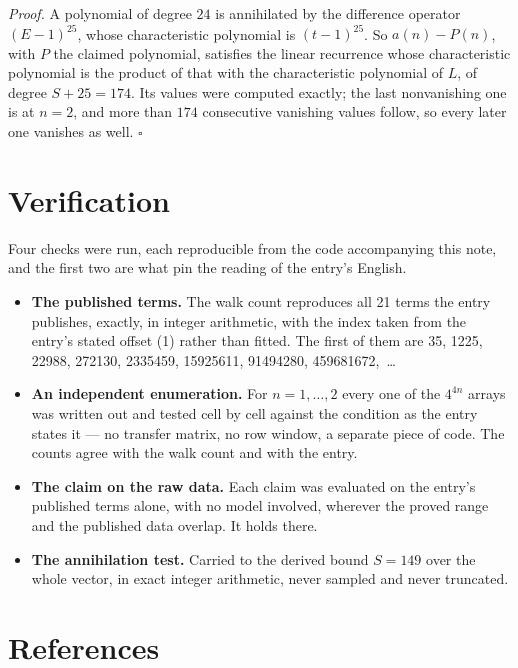 \documentclass[11pt]{article}
\theoremstyle{definition}
\begin{document}
{\itshape Proof.} A polynomial of degree $24$ is annihilated by the difference operator $(E-1)^{25}$, whose characteristic polynomial is $(t-1)^{25}$. So $a(n) - P(n)$, with $P$ the claimed polynomial, satisfies the linear recurrence whose characteristic polynomial is the product of that with the characteristic polynomial of $L$, of degree $S + 25 = 174$. Its values were computed exactly; the last nonvanishing one is at $n = 2$, and more than $174$ consecutive vanishing values follow, so every later one vanishes as well. $\square$

\section{Verification}

Four checks were run, each reproducible from the code accompanying this note, and the first two are what pin the reading of the entry's English.

\begin{itemize}

\item {\bfseries The published terms.} The walk count reproduces all 21 terms the entry publishes, exactly, in integer arithmetic, with the index taken from the entry's stated offset (1) rather than fitted. The first of them are 35, 1225, 22988, 272130, 2335459, 15925611, 91494280, 459681672,~\dots

\item {\bfseries An independent enumeration.} For $n = 1,\dots,2$ every one of the $4^{4n}$ arrays was written out and tested cell by cell against the condition as the entry states it --- no transfer matrix, no row window, a separate piece of code. The counts agree with the walk count and with the entry.

\item {\bfseries The claim on the raw data.} Each claim was evaluated on the entry's published terms alone, with no model involved, wherever the proved range and the published data overlap. It holds there.

\item {\bfseries The annihilation test.} Carried to the derived bound $S = 149$ over the whole vector, in exact integer arithmetic, never sampled and never truncated.

\end{itemize}

\section{References}
\end{document}
